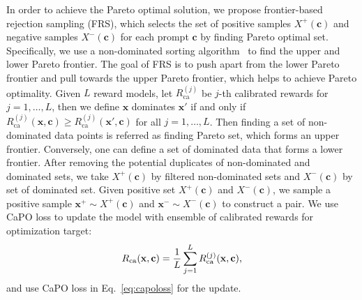 In order to achieve the Pareto optimal solution, we propose frontier-based rejection sampling (FRS), which selects the set of positive samples $X^+(\mathbf{c})$ and negative samples $X^-(\mathbf{c})$ for each prompt $\mathbf{c}$ by finding Pareto optimal set. 
Specifically, we use a non-dominated sorting algorithm~\citep{deb2002fast} to find the upper and lower Pareto frontier. 
The goal of FRS is to push apart from the lower Pareto frontier and pull towards the upper Pareto frontier, which helps to achieve Pareto optimality.
Given $L$ reward models, let $R_{\textrm{ca}}^{(j)}$ be $j$-th calibrated rewards for $j=1,\ldots, L$, then we define $\mathbf{x}$ dominates $\mathbf{x}'$ if and only if $R_{\textrm{ca}}^{(j)}(\mathbf{x}, \mathbf{c}) \geq R_{\textrm{ca}}^{(j)}(\mathbf{x}', \mathbf{c})$ for all $j=1,\ldots, L$. 
Then finding a set of non-dominated data points is referred as finding Pareto set, which forms an upper frontier. Conversely, one can define a set of dominated data that forms a lower frontier. 
After removing the potential duplicates of non-dominated and dominated sets, we take $X^+(\mathbf{c})$ by filtered non-dominated sets and $X^-(\mathbf{c})$ by set of dominated set. 
Given positive set ${X}^+(\mathbf{c})$ and $X^-(\mathbf{c})$, we sample a positive sample $\mathbf{x}^+\sim X^+(\mathbf{c})$ and $\mathbf{x}^-\sim X^-(\mathbf{c})$ to construct a pair.
We use CaPO loss to update the model with ensemble of calibrated rewards for optimization target:
\vspace{-2mm}
\begin{equation*}
\vspace{-2mm}
    R_{\textrm{ca}}(\mathbf{x}, \mathbf{c}) = \frac{1}{L} \sum_{j=1}^L R_{\textrm{ca}}^{(j)}(\mathbf{x}, \mathbf{c})\text{,}
\end{equation*}
and use CaPO loss in Eq.~\eqref{eq:capoloss} for the update.



